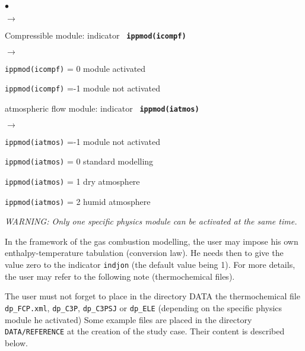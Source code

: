 {{\begin{list}{$\bullet$}{}
\begin{list}{$\rightarrow$}{}
         \end{list}
       \item Compressible module: indicator {\bf \tt
             ippmod(icompf)}
        \begin{list}{$\rightarrow$}{}
               \item \texttt{ippmod(icompf)} = 0 module activated
               \item \texttt{ippmod(icompf)} =-1 module not activated
         \end{list}
       \item atmospheric flow module: indicator {\bf \tt
             ippmod(iatmos)}
        \begin{list}{$\rightarrow$}{}
               \item \texttt{ippmod(iatmos)} =-1 module not activated
               \item \texttt{ippmod(iatmos)} = 0 standard modelling
               \item \texttt{ippmod(iatmos)} = 1 dry atmosphere
               \item \texttt{ippmod(iatmos)} = 2 humid atmosphere
         \end{list}
\end{list}

{\em WARNING: Only one specific physics module can be activated at the
same time.}

In the framework of the gas combustion modelling, the user may impose
his own enthalpy-temperature tabulation (conversion law). He needs then
to give the
value zero to the indicator \texttt{indjon} (the default value
being 1). For more details, the user may refer to the following note
(thermochemical files).

The user must not forget to place in the directory DATA the
thermochemical file \texttt{dp\_FCP.xml}, \texttt{dp\_C3P}, \texttt{dp\_C3PSJ} or
\texttt{dp\_ELE} (depending on the specific physics module he activated)
Some example files are placed in the directory \texttt{DATA/REFERENCE} at the creation of the
study case. Their content is described below.

}}
